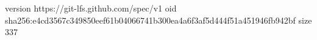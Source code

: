 version https://git-lfs.github.com/spec/v1
oid sha256:e4cd3567c349850eef61b04066741b300ea4a6f3af5d444f51a451946fb942bf
size 337
